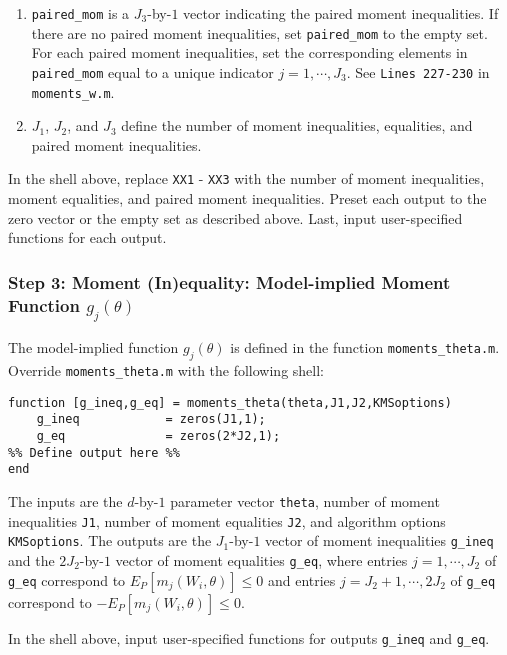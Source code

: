 \documentclass[12pt]{article}
\def\code#1{\texttt{#1}}
\begin{document}
\begin{enumerate}
    \item \code{paired\_mom} is a $J_3$-by-$1$ vector indicating the paired moment inequalities.  If there are no paired moment inequalities, set  \code{paired\_mom} to the empty set.  For each paired moment inequalities, set the corresponding elements in \code{paired\_mom} equal to a unique indicator $j = 1,\cdots,J_3$.  See \code{Lines 227-230}  in \code{moments\_w.m}.

    \item $J_1$, $J_2$, and $J_3$ define the number of moment inequalities, equalities, and paired moment inequalities.
\end{enumerate}
In the shell above, replace \code{XX1} - \code{XX3} with the number of moment inequalities, moment equalities, and paired moment inequalities.  Preset each output to the zero vector or the empty set as described above.  Last, input user-specified functions for each output.


\subsubsection*{Step 3: Moment (In)equality: Model-implied Moment Function $g_j(\theta)$}
The model-implied function $g_j(\theta)$ is defined in the function \code{moments\_theta.m}.  Override  \code{moments\_theta.m} with the following shell:
\footnotesize
\begin{lstlisting}[backgroundcolor = \color{gray!30},
                   xleftmargin = 0cm,
                   framexleftmargin = 1em]
function [g_ineq,g_eq] = moments_theta(theta,J1,J2,KMSoptions)
    g_ineq            = zeros(J1,1);
    g_eq              = zeros(2*J2,1);
%% Define output here %%
end
\end{lstlisting} \normalsize
The inputs are the $d$-by-$1$ parameter vector \code{theta}, number of moment inequalities \code{J1}, number of moment equalities \code{J2}, and algorithm options \code{KMSoptions}.  The outputs are the $J_1$-by-$1$ vector of moment inequalities \code{g\_ineq} and the $2J_2$-by-$1$ vector of moment equalities \code{g\_eq}, where entries $j=1,\cdots,J_2$ of \code{g\_eq} correspond to $E_P[m_j(W_i,\theta)] \leq 0$ and entries $j = J_2+1,\cdots,2J_2$ of \code{g\_eq} correspond to $-E_P[m_j(W_i,\theta)] \leq 0$.

In the shell above, input user-specified functions for outputs \code{g\_ineq} and \code{g\_eq}.
\end{document}

